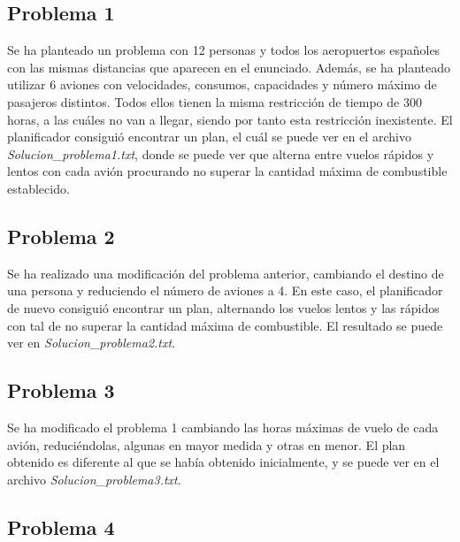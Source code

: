 \documentclass[11pt,a4paper]{article}
\begin{document}
\subsection{Problema 1}

Se ha planteado un problema con 12 personas y todos los aeropuertos españoles con las mismas distancias que aparecen en el enunciado.
Además, se ha planteado utilizar 6 aviones con velocidades, consumos, capacidades y número máximo de pasajeros distintos. Todos ellos
tienen la misma restricción de tiempo de 300 horas, a las cuáles no van a llegar, siendo por tanto esta restricción inexistente.
El planificador consiguió encontrar un plan, el cuál se puede ver en el archivo \textit{Solucion\_problema1.txt}, donde se puede ver
que alterna entre vuelos rápidos y lentos con cada avión procurando no superar la cantidad máxima de combustible establecido.

\subsection{Problema 2}

Se ha realizado una modificación del problema anterior, cambiando el destino de una persona y reduciendo el número de aviones
a 4. En este caso, el planificador de nuevo consiguió encontrar un plan, alternando los vuelos lentos y las rápidos con tal de
no superar la cantidad máxima de combustible. El resultado se puede ver en \textit{Solucion\_problema2.txt}.

\subsection{Problema 3}

Se ha modificado el problema 1 cambiando las horas máximas de vuelo de cada avión, reduciéndolas, algunas en mayor medida y otras
en menor. El plan obtenido es diferente al que se había obtenido inicialmente, y se puede ver en el archivo \textit{Solucion\_problema3.txt}.

\subsection{Problema 4}
\end{document}
